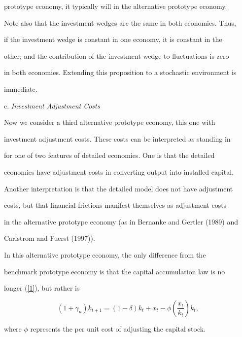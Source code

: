 \documentclass[fleqn,leqno,11pt]{article}
\begin{document}
prototype economy, it typically will in the alternative prototype economy.

Note also that the investment wedges are the same in both economies. Thus,

if the investment wedge is constant in one economy, it is constant in the

other; and the contribution of the investment wedge to fluctuations is zero

in both economies. Extending this proposition to a stochastic environment is

immediate.



\bigskip



\noindent c. \emph{Investment Adjustment Costs}



Now we consider a third alternative prototype economy, this one with

investment adjustment costs. These costs can be interpreted as standing in

for one of two features of detailed economies. One is that the detailed

economies have adjustment costs in converting output into installed capital.

Another interpretation is that the detailed model does not have adjustment

costs, but that financial frictions manifest themselves as adjustment costs

in the alternative prototype economy (as in Bernanke and Gertler (1989) and

Carlstrom and Fuerst (1997)).



In this alternative prototype economy, the only difference from the

benchmark prototype economy is that the capital accumulation law is no

longer (\ref{1}), but rather is%

\begin{equation}

(1+\gamma _{n})k_{t+1}=(1-\delta )k_{t}+x_{t}-\phi \left( \frac{x_{t}}{k_{t}}%

\right) k_{t},  \label{capital adjust}

\end{equation}%

where $\phi $ represents the per unit cost of adjusting the capital stock.
\end{document}
